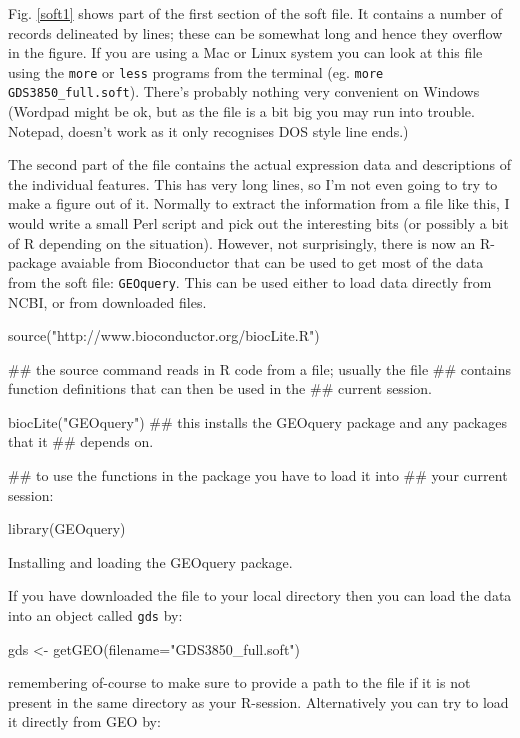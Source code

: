 \documentclass[11pt]{article}
\begin{document}
Fig. \ref{soft1} shows part of the first section of the soft file. It contains a number of records
delineated by lines; these can be somewhat long and hence they overflow in the figure. If you
are using a Mac or Linux system you can look at this file using the \texttt{more} or \texttt{less}
programs from the terminal (eg. \texttt{more GDS3850\_full.soft}). There's probably
nothing very convenient on Windows (Wordpad might be ok, but as the file is a bit big you
may run into trouble. Notepad, doesn't work as it only recognises DOS style line ends.) 

The second part of the file contains the actual expression data and descriptions of the individual
features. This has very long lines, so I'm not even going to try to make a figure
out of it. Normally to extract the information from a file like this, I would write
a small Perl script and pick out the interesting bits (or possibly a bit of R depending
on the situation). However, not surprisingly, there is now an R-package avaiable from
Bioconductor that can be used to get most of the data from the soft file: \texttt{GEOquery}.
This can be used either to load data directly from NCBI, or from downloaded files.

\begin{listing}
\begin{rcode}
source("http://www.bioconductor.org/biocLite.R")

## the source command reads in R code from a file; usually the file
## contains function definitions that can then be used in the
## current session.

biocLite("GEOquery")
## this installs the GEOquery package and any packages that it
## depends on.

## to use the functions in the package you have to load it into
## your current session:

library(GEOquery)
\end{rcode}
\caption{Installing and loading the GEOquery package.}
\label{lis1}
\end{listing}

If you have downloaded the file to your local directory then you can
load the data into an object called \texttt{gds} by:

\begin{rcode}
  gds <- getGEO(filename="GDS3850_full.soft")
\end{rcode}

remembering of-course to make sure to provide a path to the file if
it is not present in the same directory as your R-session.
Alternatively you can try to load it directly from GEO by:
\end{document}
